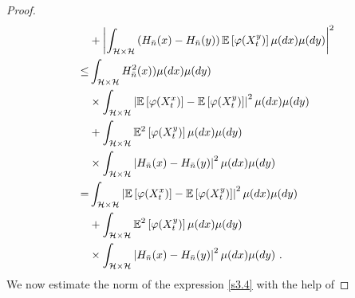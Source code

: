 \documentclass[review,onefignum,onetabnum]{siamart190516}
\begin{document}
\begin{proof}
\begin{equation}
\begin{aligned}
            &+
            \left|
                \int_{\mathcal{H}
                \times
                \mathcal{H}
                }
                \left(
                    H_{\bar n}(x) - H_{\bar n}(y)
                \right)
                \E\left[
                    \varphi(X_t ^ y)
                \right]
                \mu(dx)\mu(dy)
            \right|^2
            \\
            \le &
            \int_{\mathcal{H}\times \mathcal{H}}
                H_{\bar n}^2(x))
            \mu(dx)\mu(dy)
            \\
            &\times
                \int_{\mathcal{H}\times \mathcal{H}}
                \left|
                    \E\left [
                        \varphi(X_t^x)
                    \right]
                    -
                    \E\left[
                        \varphi(X_t^y)
                    \right]
                \right|^2
                \mu(dx)\mu(dy)
            \\
            &+
            \int_{\mathcal{H} \times \mathcal{H}}
                \E^2
                \left[
                    \varphi(X_t^y)
                \right]
            \mu(dx)\mu(dy)
            \\
             &\times
            \int_{\mathcal{H}\times \mathcal{H}}
            \left|
                H_{\bar n}(x)-H_{\bar n}(y)
            \right|^2
            \mu(dx)\mu(dy)
            \\
            =&
            \int_{\mathcal{H}\times \mathcal{H}}
            \left|
                    \E 
                    \left [
                        \varphi(X_t^x)
                    \right]
                    -
                    \E\left[
                        \varphi(X_t^y)
                    \right]
                \right|^2
                \mu(dx) \mu(dy)
            \\
            &+
            \int_{\mathcal{H}\times \mathcal{H}}
                \E^2
                \left[
                    \varphi(X_t^y)
                \right]
            \mu(dx)\mu(dy)
            \\
            & \times
            \int_{\mathcal{H}\times \mathcal{H}}
            \left|
                H_{\bar n}(x)
                    -
                    H_{\bar n}(y)
            \right|^2
            \mu(dx)\mu(dy)
        \ .
    \end{aligned}
    \label{s3.4.1}
\end{equation}
We now estimate the norm of the expression \eqref{s3.4} with the help of

\end{proof}
\end{document}
